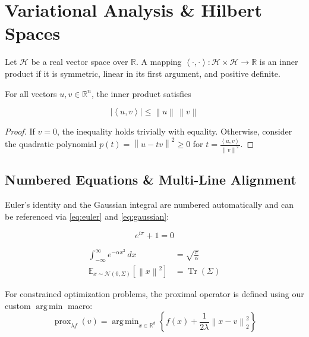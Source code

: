 \documentclass[11pt,a4paper]{article}
\newcommand{\R}{\mathbb{R}}
\newcommand{\E}{\mathbb{E}}
\newcommand{\norm}[1]{\left\lVert #1 \right\rVert}
\newcommand{\inner}[2]{\left\langle #1, #2 \right\rangle}
\DeclareMathOperator*{\argmin}{arg\,min}
\begin{document}
\section{Variational Analysis \& Hilbert Spaces}\label{sec:variational}

\begin{definition}\label{def:hilbert}
Let $\mathcal{H}$ be a real vector space over $\R$. A mapping $\inner{\cdot}{\cdot} : \mathcal{H} \times \mathcal{H} \to \R$ is an inner product if it is symmetric, linear in its first argument, and positive definite.
\end{definition}

\begin{theorem}\label{thm:cauchy}
For all vectors $u, v \in \R^n$, the inner product satisfies
\end{theorem}

\begin{equation}\label{eq:cauchy}
  \left| \inner{u}{v} \right| \le \norm{u} \, \norm{v}
\end{equation}

\begin{proof}
If $v = 0$, the inequality holds trivially with equality. Otherwise, consider the quadratic polynomial $p(t) = \norm{u - t v}^2 \ge 0$ for $t = \frac{\inner{u}{v}}{\norm{v}^2}$.
\end{proof}

\subsection{Numbered Equations \& Multi-Line Alignment}\label{sec:equations}

Euler's identity and the Gaussian integral are numbered automatically and can be referenced via \eqref{eq:euler} and \eqref{eq:gaussian}:

\begin{equation}\label{eq:euler}
  e^{i\pi} + 1 = 0
\end{equation}

\begin{align}\label{eq:gaussian}
  \int_{-\infty}^{\infty} e^{-\alpha x^2} \, dx &= \sqrt{\frac{\pi}{\alpha}} \\
  \E_{x \sim \mathcal{N}(0, \Sigma)}\!\left[ \norm{x}^2 \right] &= \operatorname{Tr}(\Sigma)
\end{align}

For constrained optimization problems, the proximal operator is defined using our custom $\argmin$ macro:
\[
  \operatorname{prox}_{\lambda f}(v) = \argmin_{x \in \R^d} \left\{ f(x) + \frac{1}{2\lambda} \norm{x - v}_2^2 \right\}
\]


\end{document}
